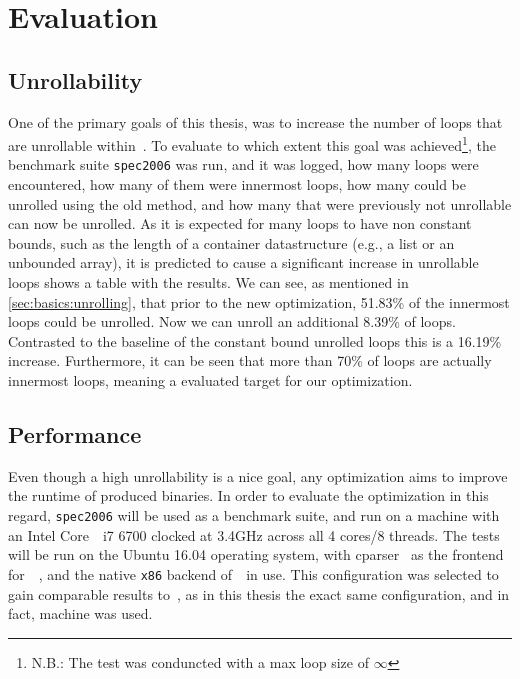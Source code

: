 \chapter{Evaluation}\label{sec:eval}

\section{Unrollability}\label{sec:eval:unrollability}

One of the primary goals of this thesis, was to increase the number of loops that are unrollable within~\libFIRM.
To evaluate to which extent this goal was achieved\footnote{N.B.: The test was conduncted with a max loop size of $\infty$}, the benchmark suite \texttt{spec2006} was run, and it was logged, how many loops were encountered, how many of them were innermost loops, how many could be unrolled using the old method, and how many that were previously not unrollable can now be unrolled.
As it is expected for many loops to have non constant bounds, such as the length of a container datastructure (e.g., a list or an unbounded array), it is predicted to cause a significant increase in unrollable loops
 shows a table with the results.
We can see, as mentioned in \cref{sec:basics:unrolling}, that prior to the new optimization, 51.83\% of the innermost loops could be unrolled.
Now we can unroll an additional 8.39\% of loops.
Contrasted to the baseline of the constant bound unrolled loops this is a 16.19\% increase.
Furthermore, it can be seen that more than 70\% of loops are actually innermost loops, meaning a evaluated target for our optimization.



\section{Performance}\label{sec:eval:perf}

Even though a high unrollability is a nice goal, any optimization aims to improve the runtime of produced binaries.
In order to evaluate the optimization in this regard, \texttt{spec2006} will be used as a benchmark suite, and run on a machine with an Intel Core~\textregistered~i7 6700 clocked at 3.4GHz across all 4 cores/8 threads.
The tests will be run on the Ubuntu 16.04 operating system, with cparser~\cite{cparser} as the frontend for~\libFIRM~, and the native \texttt{x86} backend of~\libFIRM~in use.
This configuration was selected to gain comparable results to~\cite{aebi18bachelorarbeit}, as in this thesis the exact same configuration, and in fact, machine was used.

